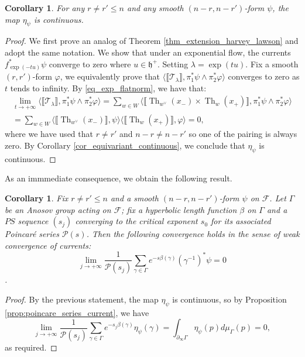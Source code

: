 \documentclass[12pt]{amsbook}%
\newtheorem{cor}[thm]{Corollary}
\theoremstyle{definition}
\theoremstyle{remark}
\numberwithin{section}{chapter}
\numberwithin{subsection}{section}
\numberwithin{figure}{chapter}
\DeclareMathOperator{\Th}{Th}
\newcommand\intcur[1]{\llbracket #1 \rrbracket}
\def\cF{{\mathscr{F}}}
\def\cP{{\mathscr{P}}}
\def\Ga{\Gamma}
\begin{document}
{{\begin{cor} For any $r\neq r' \leqslant n$ and any smooth $(n-r,n-r')$-form $\psi$, the map $\eta_{\psi}$ is continuous.  
\end{cor}  
  
\begin{proof}
We first prove an analog of Theorem \ref{thm_extension_harvey_lawson} and adopt the same notation.  We show that under an exponential flow, the currents $f^*_{\exp(-t u)} \psi$ converge to zero where $u \in \mathfrak{h}^+$. Setting $\lambda = \exp(t u)$.
Fix a smooth $(r,r')$-form $\varphi$, we equivalently prove that  $\langle \intcur{\mathcal{T}_{\lambda}} , \pi_1^* \psi \wedge \pi_2^* \varphi \rangle  $ converges to zero as $t$ tends to infinity. 
By \eqref{eq_exp_flatnorm}, we have that: 
\begin{multline*}
\lim_{t\rightarrow +\infty} \langle \intcur{\mathcal{T}_{\lambda}} , \pi_1^* \psi \wedge \pi_2^* \varphi \rangle = \sum_{w\in W} \langle  \intcur{\Th_{w^\vee}(x_-)\times \Th_w(x_+)}, \pi_1^* \psi \wedge \pi_2^*\varphi \rangle \\= \sum_{w \in W} \langle \intcur{\Th_{w^{\vee}}(x_-)}, \psi \rangle \langle \intcur{\Th_{w}(x_+)}, \varphi \rangle =0, 
\end{multline*}
where we have used that $r \neq r'$ and $n-r \neq n-r'$ so one of the pairing is always zero. 
By Corollary \ref{cor_equivariant_continuous}, we conclude that $\eta_{\psi}$ is continuous. 
\end{proof}  
  
 As an immmediate consequence, we obtain the following result. 
\begin{cor} Fix $r \neq  r'\leqslant n$ and a smooth $(n-r,n-r')$-form $\psi$ on $\cF$. Let $\Gamma$ be an Anosov group acting on $\cF$; fix a hyperbolic length function $\beta$ on $\Gamma$ and a $PS$ sequence $(s_j)$ converging to the critical exponent $s_0$ for its associated Poincar\'e series $\cP(s)$. Then the following convergence holds in the sense of weak convergence of currents: 
\begin{equation*}
\lim_{j\rightarrow +\infty} \dfrac{1}{\cP(s_j)} \sum_{\gamma \in \Gamma} e^{-s \beta(\gamma)} (\gamma^{-1})^* \psi = 0
\end{equation*} .
\end{cor} 
   
   \begin{proof}
   By the previous statement, the map $\eta_{\psi} $ is continuous, so by Proposition \ref{prop:poincare_series_current}, we have
  \begin{equation*}
  \lim_{j\rightarrow +\infty} \dfrac{1}{\cP(s_j)} \sum_{\gamma \in \Ga} e^{-s_j \beta(\gamma)} \eta_{\psi}(\gamma) = \int_{\partial_{\infty} \Gamma} \eta_{\psi}(p) d\mu_{\Gamma}(p) = 0 ,
  \end{equation*}
  as required.
   \end{proof}
   
}}
\end{document}
